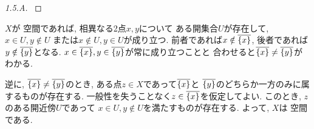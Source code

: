 \documentclass[uplatex, dvipdfmx, a4paper, 12pt, class=jsarticle, crop=false]{standalone}
\begin{document}
\begin{proof}[1.5.A]\label{eng-1-5-A-proof}

\end{proof}
	\(X\)が  空間であれば, 相異なる2点\(x, y\)について
	ある開集合\(U\)が存在して, \(x \in U, y \notin U\)
	または\(x \notin U, y \in U\)が成り立つ.
	前者であれば\(x \notin \topbar{\lrbrace{x}}\),
	後者であれば\(y \notin \topbar{\lrbrace{y}}\)となる.
	\(x \in \topbar{\lrbrace{x}}, y \in \topbar{\lrbrace{y}}\)が常に成り立つことと
	合わせると\(\topbar{\lrbrace{x}} \neq \topbar{\lrbrace{y}}\)がわかる.

	逆に, \(\topbar{\lrbrace{x}}
	\neq \topbar{\lrbrace{y}}\)のとき,
	ある点\(z \in X\)であって\(\topbar{\lrbrace{x}}\)と
	\(\topbar{\lrbrace{y}}\)のどちらか一方のみに属するものが存在する.
	一般性を失うことなく\( z \in \topbar{\lrbrace{x}} \)を仮定してよい.
	このとき, \(z\)のある開近傍\(U\)であって
	\(x \in U, y \notin U\)を満たすものが存在する.
	よって, \(X\)は  空間である.
\end{document}
